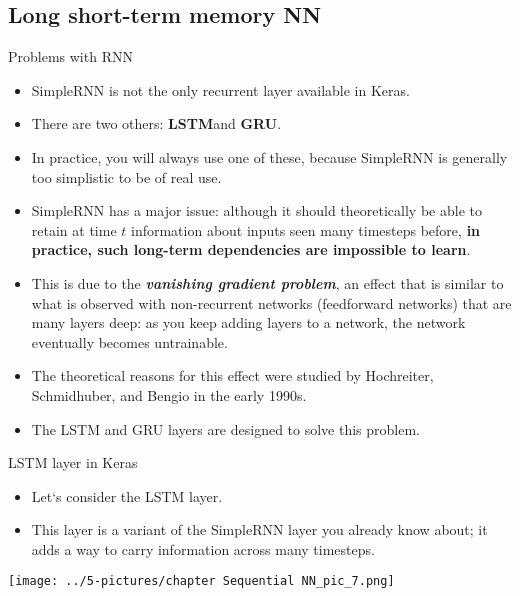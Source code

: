 \documentclass[11pt]{beamer}
\begin{document}
\subsection{Long short-term memory NN \\ \scalebox{0.8}{}}
%
\begin{frame}{Problems with RNN}
	\begin{itemize}
		\item SimpleRNN is not the only recurrent layer available in Keras. 
		\item There are two others: \textbf{LSTM}and \textbf{GRU}. 
		\item In practice, you will always use one of these, because SimpleRNN is generally too simplistic to be of real use. 
		\item SimpleRNN has a major issue: although it should theoretically be able to retain at time $t$ information about inputs seen many timesteps before, \textbf{in practice, such long-term dependencies are impossible to learn}. 
		\item This is due to the \textbf{\textit{vanishing gradient problem}}, an effect that is similar to what is observed with non-recurrent networks (feedforward networks) that are many layers deep: as you keep adding layers to a network, the network eventually becomes untrainable. 
		\item The theoretical reasons for this effect were studied by Hochreiter, Schmidhuber, and Bengio in the early 1990s.
		\item The LSTM and GRU layers are designed to solve this problem.
	\end{itemize}
\end{frame}
\begin{frame}{LSTM layer in Keras}
	\begin{itemize}
		\item Let`s consider the LSTM layer. 
		\item This layer is a variant of the SimpleRNN layer you already know about; it adds a way to carry information across many timesteps.
	\end{itemize}
	\begin{center}
	\texttt{[image: ../5-pictures/chapter Sequential NN\_pic\_7.png]}
	\end{center}
\end{frame}
\end{document}
